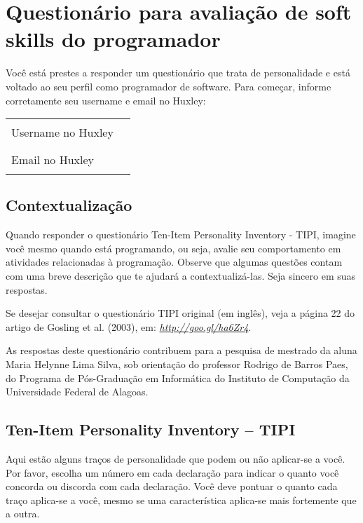 \chapter{Questionário para avaliação de soft skills do programador}
\label{ap:tipi}

Você está prestes a responder um questionário que trata de personalidade e está voltado ao seu perfil como programador de software.
Para começar, informe corretamente seu username e email no Huxley: 

\begin{tabular}{lp{5cm}}
Username no Huxley & \noindent\rule{5cm}{0.4pt} \\

Email no Huxley	 	 & \noindent\rule{5cm}{0.4pt} \\
\end{tabular}

\section{Contextualização}

Quando responder o questionário Ten-Item Personality Inventory - TIPI, imagine você mesmo quando está programando, ou seja, avalie seu comportamento em atividades relacionadas à programação. Observe que algumas questões contam com uma breve descrição que te ajudará a contextualizá-las. Seja sincero em suas respostas.

Se desejar consultar o questionário TIPI original (em inglês), veja a página 22 do artigo de Gosling et al. (2003)\nocite{gosling:03}, em:
\href{http://goo.gl/ha6Zr4}{\textsl{http://goo.gl/ha6Zr4}}.

As respostas deste questionário contribuem para a pesquisa de mestrado da aluna Maria Helynne Lima Silva, sob orientação do professor Rodrigo de Barros Paes, do Programa de Pós-Graduação em Informática do Instituto de Computação da Universidade Federal de Alagoas.

\section{Ten-Item Personality Inventory – TIPI}

Aqui estão alguns traços de personalidade que podem ou não aplicar-se a você.  Por favor, escolha um número em cada declaração para indicar o quanto você concorda ou discorda com cada declaração. Você deve pontuar o quanto cada traço aplica-se a você, mesmo se uma característica aplica-se mais fortemente que a outra.


